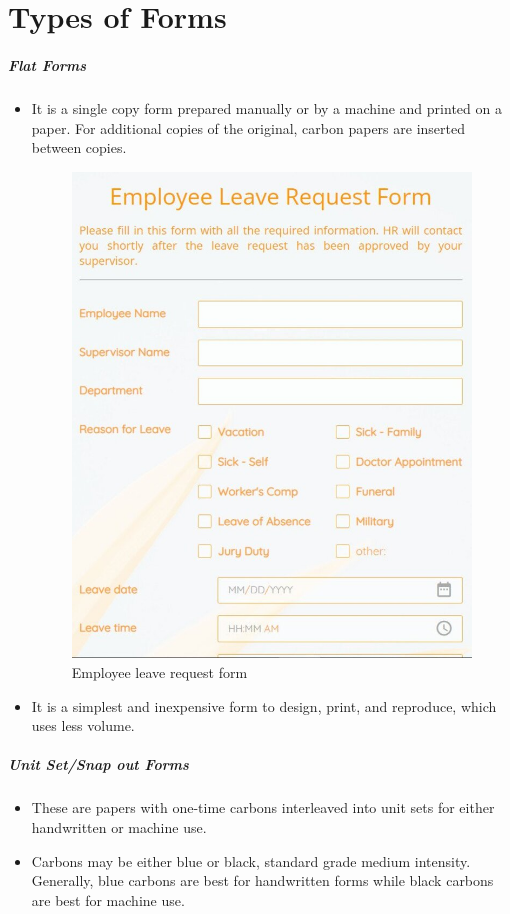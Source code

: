 \documentclass[a4paper,12pt]{report}
\begin{document}
\section{Types of Forms}
\subparagraph{Flat Forms}
\begin{itemize}
	\item	It is a single copy form prepared manually or by a machine and printed on a paper. For additional copies of the original, carbon papers are inserted between copies.
	\begin{figure}[h]
		\centering
		\includegraphics[width=0.6\linewidth]{employee-leave-request-form}
		\caption{Employee leave request form}
		\label{fig:employee-leave-request-form}
	\end{figure}
	\item	It is a simplest and inexpensive form to design, print, and reproduce, which uses less volume.
\end{itemize}
\subparagraph{Unit Set/Snap out Forms}
\begin{itemize}
	\item	These are papers with one-time carbons interleaved into unit sets for either handwritten or machine use.
	\item	Carbons may be either blue or black, standard grade medium intensity. Generally, blue carbons are best for handwritten forms while black carbons are best for machine use.
\end{itemize}
\end{document}
